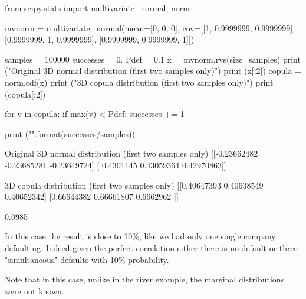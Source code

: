 \begin{ipython}
from scipy.stats import multivariate_normal, norm

mvnorm = multivariate_normal(mean=[0, 0, 0], cov=[[1, 0.9999999, 0.9999999],
                                                  [0.9999999, 1, 0.9999999],
                                                  [0.9999999, 0.9999999, 1]])  

samples = 100000
successes = 0.
Pdef = 0.1
x = mvnorm.rvs(size=samples)
print ("Original 3D normal distribution (first two samples only)")
print (x[:2])
copula = norm.cdf(x)
print ("\n3D copula distribution (first two samples only)")
print (copula[:2])

for v in copula:
    if max(v) < Pdef:
        successes += 1
        
print ("\n{}".format(successes/samples))
\end{ipython}
\begin{ioutput}
Original 3D normal distribution (first two samples only)
[[-0.23662482 -0.23685281 -0.23649724]
 [ 0.4301145   0.43059364  0.42970863]]

3D copula distribution (first two samples only)
[[0.40647393 0.40638549 0.40652342]
 [0.66644382 0.66661807 0.6662962 ]]

0.0985
\end{ioutput}
In this case the result is close to 10\%, like we had only one single company defaulting. 
Indeed given the perfect correlation either there is no default or three "simultaneous" defaults with 10\% probability.

Note that in this case, unlike in the river example, the marginal distributions were not known.


